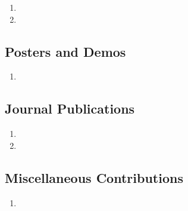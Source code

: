 \begin{enumerate}

\item {}
\item {}

\end{enumerate}

\subsection*{Posters and Demos}

\begin{enumerate}
\item {}

\end{enumerate}

\subsection*{Journal Publications}

\begin{enumerate}
\item {}
\item {}

\end{enumerate}

\subsection*{Miscellaneous Contributions}

\begin{enumerate}
\item {}
\end{enumerate}
